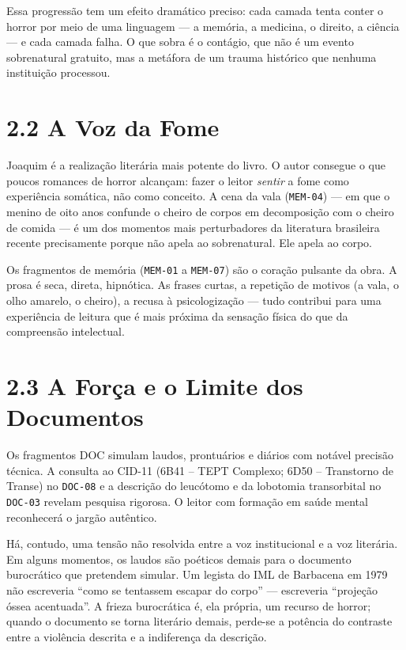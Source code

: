 \documentclass[14pt,openany]{extbook}
\newcommand{\frag}[1]{\texttt{#1}}
\begin{document}
Essa progressão tem um efeito dramático preciso: cada camada tenta conter o horror por meio de uma linguagem --- a memória, a medicina, o direito, a ciência --- e cada camada falha. O que sobra é o contágio, que não é um evento sobrenatural gratuito, mas a metáfora de um trauma histórico que nenhuma instituição processou.

\section*{2.2 A Voz da Fome}

Joaquim é a realização literária mais potente do livro. O autor consegue o que poucos romances de horror alcançam: fazer o leitor \textit{sentir} a fome como experiência somática, não como conceito. A cena da vala (\frag{MEM-04}) --- em que o menino de oito anos confunde o cheiro de corpos em decomposição com o cheiro de comida --- é um dos momentos mais perturbadores da literatura brasileira recente precisamente porque não apela ao sobrenatural. Ele apela ao corpo.

Os fragmentos de memória (\frag{MEM-01} a \frag{MEM-07}) são o coração pulsante da obra. A prosa é seca, direta, hipnótica. As frases curtas, a repetição de motivos (a vala, o olho amarelo, o cheiro), a recusa à psicologização --- tudo contribui para uma experiência de leitura que é mais próxima da sensação física do que da compreensão intelectual.

\section*{2.3 A Força e o Limite dos Documentos}

Os fragmentos DOC simulam laudos, prontuários e diários com notável precisão técnica. A consulta ao CID-11 (6B41 -- TEPT Complexo; 6D50 -- Transtorno de Transe) no \frag{DOC-08} e a descrição do leucótomo e da lobotomia transorbital no \frag{DOC-03} revelam pesquisa rigorosa. O leitor com formação em saúde mental reconhecerá o jargão autêntico.

Há, contudo, uma tensão não resolvida entre a voz institucional e a voz literária. Em alguns momentos, os laudos são poéticos demais para o documento burocrático que pretendem simular. Um legista do IML de Barbacena em 1979 não escreveria ``como se tentassem escapar do corpo'' --- escreveria ``projeção óssea acentuada''. A frieza burocrática é, ela própria, um recurso de horror; quando o documento se torna literário demais, perde-se a potência do contraste entre a violência descrita e a indiferença da descrição.
\end{document}
